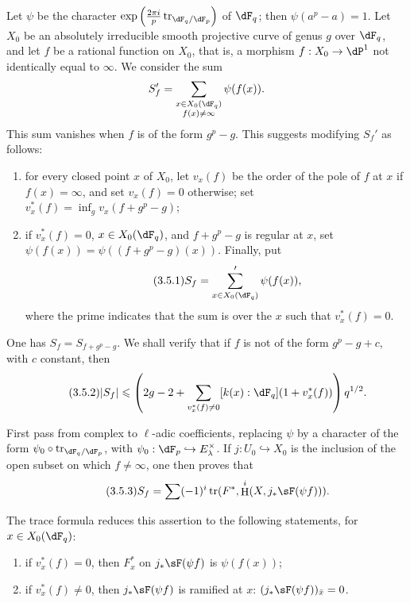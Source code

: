 \documentclass[12pt,oneside,english]{smfbook}
\DeclareMathOperator{\h}{H}
\DeclareMathOperator{\tr}{tr}
\newcounter{char}
\begin{document}
Let $\psi$ be the character $\exp\left(\frac{2\pi i}{p}\tr_{\dF_q/\dF_p}\right)$ of $\dF_q$; then $\psi(a^p-a)=1$. Let $X_0$ be an absolutely irreducible smooth projective curve of genus $g$ over $\dF_q$, and let $f$ be a rational function on $X_0$, that is, a morphism $f:X_0\to\dP^1$ not identically equal to $\infty$. We consider the sum
\[
  S_f' = \sum_{\substack{x\in X_0(\dF_q) \\ f(x)\ne \infty}} \psi(f(x))
  \text{.}
\]
This sum vanishes when $f$ is of the form $g^p-g$. This suggests modifying $S_f'$ as follows:
\begin{enumerate}[\indent a)]
  \item for every closed point $x$ of $X_0$, let $v_x(f)$ be the order of the pole of $f$ at $x$ if $f(x)=\infty$, and set $v_x(f)=0$ otherwise; set $v_x^\ast(f)=\inf_g v_x(f+g^p-g)$;
  \item if $v_x^\ast(f)=0$, $x\in X_0(\dF_q)$, and $f+g^p-g$ is regular at $x$, set $\psi(f(x))=\psi((f+g^p-g)(x))$. Finally, put
    \begin{equation*}\tag{3.5.1}\label{VI:eq:3-5-1}
      S_f = \sum'_{x\in X_0(\dF_q)} \psi(f(x)) \text{,}
    \end{equation*}
    where the prime indicates that the sum is over the $x$ such that $v_x^\ast(f)=0$.
\end{enumerate}

One has $S_f=S_{f+g^p-g}$. We shall verify that if $f$ is not of the form $g^p-g+c$, with $c$ constant, then
\begin{equation*}\tag{3.5.2}\label{VI:eq:3-5-2}
  |S_f|\leqslant \left(2 g-2+\sum_{v_x^\ast(f)\ne 0} [k(x):\dF_q] (1+v_x^\ast(f))\right) q^{1/2} \text{.}
\end{equation*}

First pass from complex to $\ell$-adic coefficients, replacing $\psi$ by a character of the form $\psi_0\circ\tr_{\dF_q/\dF_p}$, with $\psi_0:\dF_p\hookrightarrow E_\lambda^\times$. If $j:U_0\hookrightarrow X_0$ is the inclusion of the open subset on which $f\ne\infty$, one then proves that
\begin{equation*}\tag{3.5.3}\label{VI:eq:3-5-3}
  S_f = \sum (-1)^i \tr(F^\ast,\h^i(X,j_\ast \sF(\psi f))) \text{.}
\end{equation*}

The trace formula reduces this assertion to the following statements, for $x\in X_0(\dF_q)$:
\begin{enumerate}[\indent a)]
  \item if $v_x^\ast(f)=0$, then $F_x^\ast$ on $j_*\sF(\psi f)$ is $\psi(f(x))$;
  \item if $v_x^\ast(f)\ne0$, then $j_*\sF(\psi f)$ is ramified at $x$: $(j_*\sF(\psi f))_{\bar x}=0$.
\end{enumerate}
\end{document}
